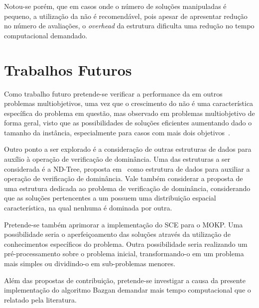 %

Notou-se porém, que em casos onde o número de soluções manipuladas é pequeno, a utilização
da \kdtree{} não é recomendável, pois apesar de apresentar redução no número de
avaliações, o \emph{overhead} da estrutura dificulta uma redução no tempo computacional demandado.

\section{Trabalhos Futuros}

Como trabalho futuro pretende-se verificar a performance da \kdtree{} em outros problemas
multiobjetivos, uma vez que o crescimento do \paretoset{} não é
uma característica específica do problema em questão, mas observado
em problemas multiobjetivo de forma geral, visto que as possibilidades de soluções
eficientes aumentando dado o tamanho da instância,
especialmente para casos com mais dois objetivos~\cite{ehrgott2013multicriteria}.

Outro ponto a ser explorado é a consideração de outras estruturas de dados
para auxílio à operação de verificação de dominância.
Uma das estruturas a ser considerada é a ND-Tree, proposta
em~\cite{jaszkiewicz2017} como estrutura de dados para auxiliar
a operação de verificação de dominância.
Vale também considerar a proposta de uma estrutura dedicada ao
problema de verificação de dominância, considerando que as
soluções pertencentes a um \paretoset{} possuem uma distribuição espacial
característica, na qual nenhuma é dominada por outra.

Pretende-se também aprimorar a implementação do SCE para o MOKP.
Uma possibilidade seria o aperfeiçoamento das soluções
através da utilização de conhecimentos específicos do problema.
Outra possibilidade seria realizando um pré-processamento sobre o problema inicial,
transformando-o em um problema mais simples ou dividindo-o em sub-problemas
menores.

Além das propostas de contribuição, pretende-se investigar a causa da
presente implementação do algoritmo Bazgan demandar mais tempo computacional
que o relatado pela literatura.



